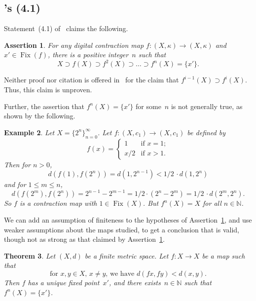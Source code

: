 \documentclass{article}
\newtheorem{thm}{Theorem}
\newtheorem{assert}[thm]{Assertion}
\newtheorem{exl}[thm]{Example}
\numberwithin{thm}{section}
\DeclareMathOperator{\Fix}{Fix}
\def\N{{\mathbb N}}
\begin{document}
\subsection{\cite{Han19}'s (4.1)}
Statement~(4.1) of~\cite{Han19} claims the following.
\begin{assert}
\label{Han(4.1)}
    For any digital contraction map
    $f: (X,\kappa) \to (X,\kappa)$ and $x' \in \Fix(f)$,
    there is a positive integer~$n$ such that
    \[ X \supset f(X) \supset f^2(X) \supset \ldots 
     \supset f^n(X) = \{x'\}.
    \]
\end{assert}

Neither proof nor citation
is offered in~\cite{Han19}
for the claim that
$f^{i-1}(X) \supset f^i(X)$.
Thus, this claim is unproven.

Further, the assertion that
$f^n(X) = \{x'\}$ for some~$n$ 
is not generally true, as 
shown by the following.

\begin{exl}
Let $X = \{2^n\}_{n=0}^{\infty}$. Let 
$f: (X,c_1) \to (X,c_1)$
be defined by
\[ f(x) = \left \{ \begin{array}{ll}
    1 & \mbox{if } x = 1; \\
    x/2 &  \mbox{if } x > 1.
\end{array}
\right .
\]
Then for $n > 0$,
\[ d(f(1),f(2^n)) = d(1, 2^{n-1}) < 
1/2 \, \cdot d(1,2^n)
\]
and for $1 \le m \le n$,
\[ d(f(2^m), f(2^n)) = 2^{n-1} - 2^{m-1} =
   1/2 \cdot (2^n - 2^m) = 1/2 \, \cdot d(2^m,2^n).
\]
So $f$ is a contraction map 
with $1 \in \Fix(X)$. 
But $f^n(X) = X$ for all $n \in \N$.
\end{exl}

We can add an assumption of
finiteness to the hypotheses 
of Assertion~\ref{Han(4.1)}, and
use weaker assumptions about
the maps studied, to get
a conclusion that is valid, 
though not as strong as that
claimed by Assertion~\ref{Han(4.1)}.

\begin{thm}
    \label{Han(4.1)corrected}
    Let $(X, d)$ be a 
    finite metric space.
    Let $f: X \to X$ be a map 
    such that 
    \begin{equation}
    \label{distDecrease}
        \mbox{for $x,y \in X$,
    $x \neq y$, we have } 
    d(fx,fy) < d(x,y).
    \end{equation} 
    Then $f$ has a unique fixed point~$x'$,
    and there exists~$n \in \N$ 
    such that $f^n(X) = \{x'\}$.
\end{thm}
\end{document}

